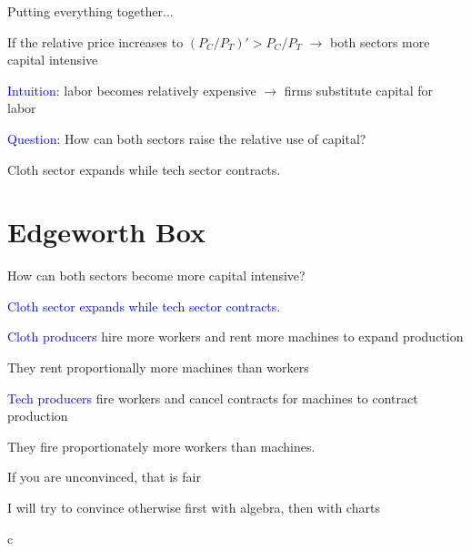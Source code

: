 \documentclass[notes,11pt, aspectratio=169, xcolor=table]{beamer}
\newcommand{\blue}[1]{\textcolor{blue}{#1}}
\newenvironment{wideitemize}{\itemize\addtolength{\itemsep}{10pt}}{\enditemize}
\begin{document}
\begin{frame}{Putting everything together...}

        \begin{wideitemize}
            \item If the relative price increases to $(P_C / P_T)' > P_C / P_T$ $\rightarrow$ both sectors more capital intensive

            \item<2-> \blue{Intuition}:  labor becomes relatively expensive $\rightarrow$ firms substitute capital for labor

            \item<3-> \blue{Question}: How can both sectors raise the relative use of capital?

            \item<4-> Cloth sector expands while tech sector contracts.


\end{wideitemize}
\end{frame}

\section{Edgeworth Box}


\begin{frame}{How can both sectors become more capital intensive?}

        \begin{wideitemize}

            \item \blue{Cloth sector expands while tech sector contracts}.

            \item<2-> \blue{Cloth producers} hire more workers and rent more machines to expand production

            \item<2-> They rent proportionally more machines than workers 

            \item<3-> \blue{Tech producers} fire workers and cancel contracts for machines to contract production
            
            \item<3-> They fire proportionately more workers than machines.

            \item<4-> If you are unconvinced, that is fair

            \item<4-> I will try to convince otherwise first with algebra, then with charts



\end{wideitemize}
c\end{frame}
\end{document}
